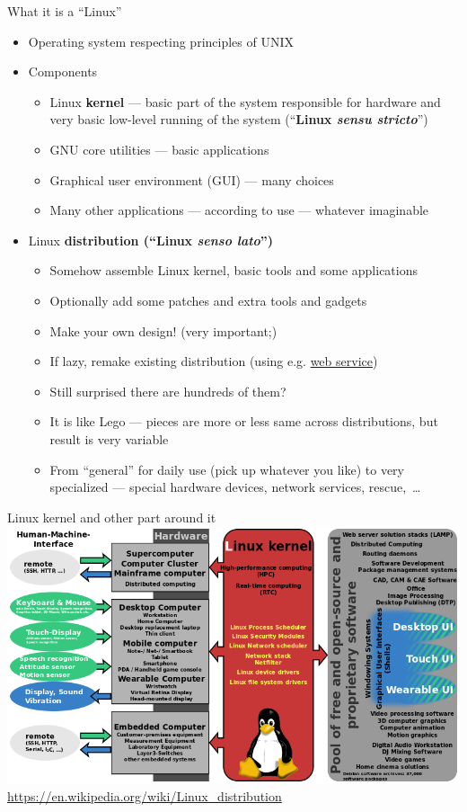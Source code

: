 \documentclass[compress, ucs, xelatex, 11pt, xcolor=svgnames,
  hyperref={
    bookmarks=true,
    unicode=true,
    colorlinks=true,
    pdftitle={Linux, command line and MetaCentrum},
    plainpages=false,
    pdfauthor={Vojtech Zeisek},
    pdfsubject={Course about use of Linux command line, writing shell scripts and using MetaCentrum of CESNET},
    pdfcreator={XeLaTeX},
    pdfkeywords={Linux, GNU, BASH, shell, command line, MetaCentrum},
    linkcolor=DarkRed,
    anchorcolor=DarkBlue,
    citecolor=Indigo,
    filecolor=NavyBlue,
    menucolor=DarkMagenta,
    urlcolor=DarkBlue,
    pdftex},
  url={hyphens, lowtilde} %
  ]{beamer}
\begin{document}
\begin{frame}{What it is a ``Linux''}
  \begin{itemize}
    \item Operating system respecting principles of UNIX
    \item Components
    \begin{itemize}
      \item Linux \textbf{kernel} --- basic part of the system responsible for hardware and very basic low-level running of the system (``\textbf{Linux \textit{sensu stricto}}'')
      \item GNU core utilities --- basic applications
      \item Graphical user environment (GUI) --- many choices
      \item Many other applications --- according to use --- whatever imaginable
    \end{itemize}
    \item Linux \textbf{distribution (``Linux \textit{senso lato}'')}
    \begin{itemize}
      \item Somehow assemble Linux kernel, basic tools and some applications
      \item Optionally add some patches and extra tools and gadgets
      \item Make your own design! (very important;)
      \item If lazy, remake existing distribution (using e.g. \href{http://openbuildservice.org/}{web service})
      \item Still surprised there are hundreds of them?
      \item It is like Lego --- pieces are more or less same across distributions, but result is very variable
      \item From ``general'' for daily use (pick up whatever you like) to very specialized --- special hardware devices, network services, rescue,~\ldots
    \end{itemize}
  \end{itemize}
\end{frame}

\begin{frame}{Linux kernel and other part around it}
  \includegraphics[width=\textwidth]{linux_kernel_ubiquity.png}
  \vfil
  \url{https://en.wikipedia.org/wiki/Linux_distribution}
  \vfill
\end{frame}
\end{document}
